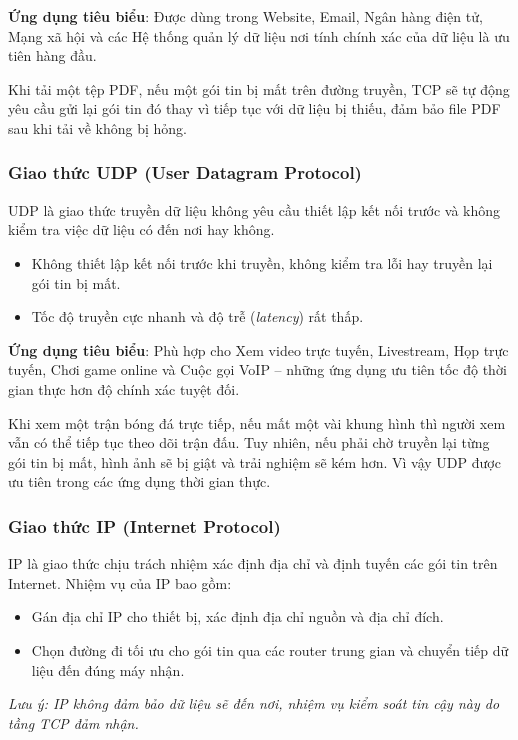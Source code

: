 \textbf{Ứng dụng tiêu biểu}: Được dùng trong Website, Email, Ngân hàng điện tử, Mạng xã hội và các Hệ thống quản lý dữ liệu nơi tính chính xác của dữ liệu là ưu tiên hàng đầu.

\begin{tipBox}
Khi tải một tệp PDF, nếu một gói tin bị mất trên đường truyền, TCP sẽ tự động yêu cầu gửi lại gói tin đó thay vì tiếp tục với dữ liệu bị thiếu, đảm bảo file PDF sau khi tải về không bị hỏng.
\end{tipBox}

\subsubsection{Giao thức UDP (User Datagram Protocol)}

UDP là giao thức truyền dữ liệu không yêu cầu thiết lập kết nối trước và không kiểm tra việc dữ liệu có đến nơi hay không.
\begin{itemize}[leftmargin=1.8em, itemsep=2pt, parsep=0pt]
    \item Không thiết lập kết nối trước khi truyền, không kiểm tra lỗi hay truyền lại gói tin bị mất.
    \item Tốc độ truyền cực nhanh và độ trễ (\textit{latency}) rất thấp.
\end{itemize}

\textbf{Ứng dụng tiêu biểu}: Phù hợp cho Xem video trực tuyến, Livestream, Họp trực tuyến, Chơi game online và Cuộc gọi VoIP -- những ứng dụng ưu tiên tốc độ thời gian thực hơn độ chính xác tuyệt đối.

\begin{tipBox}
Khi xem một trận bóng đá trực tiếp, nếu mất một vài khung hình thì người xem vẫn có thể tiếp tục theo dõi trận đấu. Tuy nhiên, nếu phải chờ truyền lại từng gói tin bị mất, hình ảnh sẽ bị giật và trải nghiệm sẽ kém hơn. Vì vậy UDP được ưu tiên trong các ứng dụng thời gian thực.
\end{tipBox}

\subsubsection{Giao thức IP (Internet Protocol)}

IP là giao thức chịu trách nhiệm xác định địa chỉ và định tuyến các gói tin trên Internet. Nhiệm vụ của IP bao gồm:
\begin{itemize}[leftmargin=1.8em, itemsep=2pt, parsep=0pt]
    \item Gán địa chỉ IP cho thiết bị, xác định địa chỉ nguồn và địa chỉ đích.
    \item Chọn đường đi tối ưu cho gói tin qua các router trung gian và chuyển tiếp dữ liệu đến đúng máy nhận.
\end{itemize}
\textit{Lưu ý: IP không đảm bảo dữ liệu sẽ đến nơi, nhiệm vụ kiểm soát tin cậy này do tầng TCP đảm nhận.}

